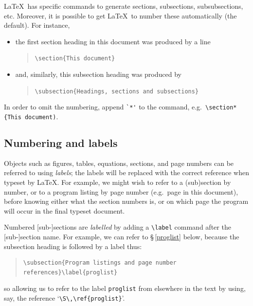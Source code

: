 \LaTeX\ has specific commands to generate sections, subsections,
subsubsections, etc. Moreover, it is possible to get \LaTeX\ to
number these automatically (the default). For instance,
\begin{itemize}

\item the first section heading in this document was produced by a
  line
\begin{quote}
\verb|\section{This document}|
\end{quote}

\item and, similarly, this subsection heading was produced by
\begin{quote}
\verb$\subsection{Headings, sections and subsections}$
\end{quote}
\end{itemize}

In order to omit the numbering, append \verb|`*'| to the command,
e.g.\ \verb|\section*{This document)|.

\subsection{Numbering and labels}

Objects such as figures, tables, equations, sections, and page numbers
can be referred to using \textit{labels}; the labels will be replaced
with the correct reference when typeset by \LaTeX.  For example, we
might wish to refer to a (sub)section by number, or to a program
listing by page number (e.g.\ page \pageref{question:2:program} in
this document), before knowing either what the section numbers is, or
on which page the program will occur in the final typeset document.

Numbered [sub-]sections are \textit{labelled} by adding a \verb!\label!
command after the [sub-]section name. For example, we can refer to
\S\,\ref{proglist} below, because the subsection heading is followed
by a label thus:
\begin{quote}
\begin{verbatim}
\subsection{Program listings and page number references}\label{proglist}
\end{verbatim}
\end{quote}
so allowing us to refer to the label \verb|proglist| from elsewhere in
the text by using, say, the reference `\verb|\S\,\ref{proglist}|'.

